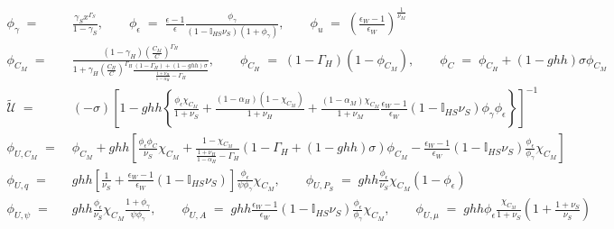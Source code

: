 \documentclass[12pt,3p,authoryear,review]{elsarticle}
\begin{document}
\begin{scriptsize}%
    \begin{align*}%
        \phi_\gamma \; = & \; \frac{\gamma_S x^{\Gamma_S}}{1-\gamma_S}, \quad \quad \phi_\epsilon \; = \; \frac{\epsilon-1}{\epsilon} \frac{\phi_\gamma}{\left(1-\mathbb{I}_{HS}\nu_S\right)\left(1+\phi_\gamma\right)}, \quad \quad \phi_u \; = \; \left(\frac{\epsilon_W-1}{\epsilon_W}\right)^{\frac{1}{\nu_M}}\\%
        \phi_{C_M} \; = & \; \frac{\left(1-\gamma_H\right)\left(\frac{C_M}{C}\right)^{\Gamma_H}}{1+\gamma_H \left(\frac{C_H}{C}\right)^{\Gamma_H} \frac{\left(1-\Gamma_H\right)+\left(1-ghh\right)\sigma}{\frac{1+\nu_H}{1-\alpha_H}-\Gamma_H}}, \quad \quad \phi_{C_H} \; = \; \left(1-\Gamma_H\right)\left(1-\phi_{C_M}\right), \quad \quad \phi_C \; = \; \phi_{C_H}+\left(1-ghh\right)\sigma\phi_{C_M}\\%
        \tilde{\mathcal{U}} \; = & \; (-\sigma) \left[ 1-ghh\left\{ \frac{\phi_\epsilon\chi_{C_M}}{1+\nu_S} + \frac{\left(1-\alpha_H\right)\left(1-\chi_{C_M}\right)}{1+\nu_H} + \frac{\left(1-\alpha_M\right)\chi_{C_M}}{1+\nu_M} \frac{\epsilon_W-1}{\epsilon_W} \left(1-\mathbb{I}_{HS}\nu_S\right)\phi_\gamma\phi_\epsilon \right\} \right]^{-1}\\%
        \phi_{U,C_M} \; = & \; \phi_{C_M} + ghh \left[ \frac{\phi_\epsilon \phi_C}{\nu_S}\chi_{C_M} + \frac{1-\chi_{C_M}}{\frac{1+\nu_H}{1-\alpha_H}-\Gamma_H} \left(1-\Gamma_H+\left(1-ghh\right)\sigma\right)\phi_{C_M} - \frac{\epsilon_W-1}{\epsilon_W}\left(1-\mathbb{I}_{HS}\nu_S\right)\frac{\phi_\epsilon}{\phi_\gamma}\chi_{C_M}\right]\\%
        \phi_{U,q} \; = & \; ghh \left[ \frac{1}{\nu_S} + \frac{\epsilon_W-1}{\epsilon_W}\left(1-\mathbb{I}_{HS}\nu_S\right) \right] \frac{\phi_\epsilon}{\psi\phi_\gamma}\chi_{C_M}, \quad \quad \phi_{U,P_S} \; = \; ghh \frac{\phi_\epsilon}{\nu_S}\chi_{C_M}\left(1-\phi_\epsilon\right)\\%
        \phi_{U,\psi} \; = & \; ghh \frac{\phi_\epsilon}{\nu_S}\chi_{C_M}\frac{1+\phi_\gamma}{\psi\phi_\gamma}, \quad \quad \phi_{U,A} \; = \; ghh\frac{\epsilon_W-1}{\epsilon_W}\left(1-\mathbb{I}_{HS}\nu_S\right)\frac{\phi_\epsilon}{\phi_\gamma}\chi_{C_M}, \quad \quad \phi_{U,\mu} \; = \; ghh \phi_\epsilon\frac{\chi_{C_M}}{1+\nu_S} \left(1+\frac{1+\nu_S}{\nu_S}\right)%
    \end{align*}%
\end{scriptsize}%
\pagebreak%
\end{document}
